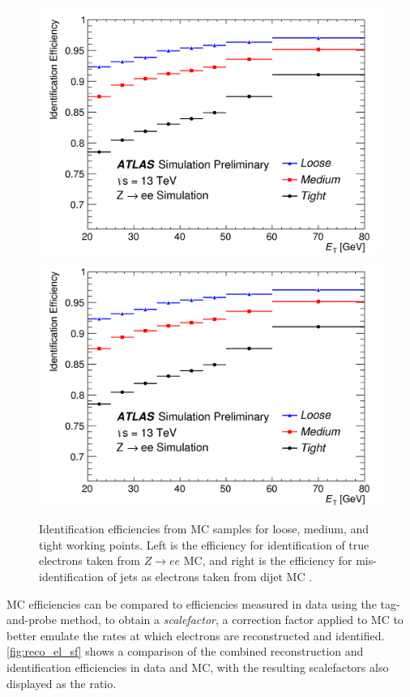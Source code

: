 \begin{centering}
\begin{figure}[!hbt]
\myfloatalign
\includegraphics[width=.48\linewidth]{figures/reco/fig_01a.png}
\includegraphics[width=.48\linewidth]{figures/reco/fig_01a.png}
\caption{ Identification efficiencies from \ac{MC} samples for loose, medium, and tight working points. Left is the efficiency for identification of true electrons taken from $Z\rightarrow ee$ \ac{MC}, and right is the efficiency for mis-identification of jets as electrons taken from dijet \ac{MC} \cite{ATLAS-CONF-2016-024}.}
\label{fig:reco_el_eff}
\end{figure}
\end{centering}

\ac{MC} efficiencies can be compared to efficiencies measured in data using the tag-and-probe method, to obtain a \textit{scalefactor}, a correction factor applied to \ac{MC} to better emulate the rates at which electrons are reconstructed and identified. \autoref{fig:reco_el_sf} shows a comparison of the combined reconstruction and identification efficiencies in data and \ac{MC}, with the resulting scalefactors also displayed as the ratio. 

